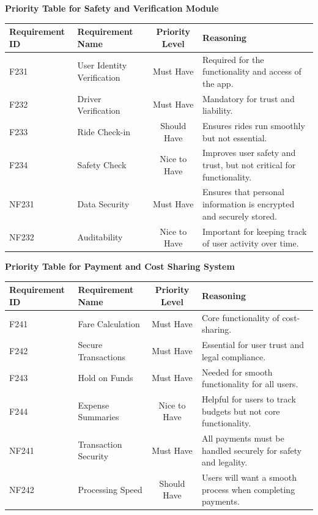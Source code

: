 \documentclass[12pt,letterpaper]{article}
\begin{document}
  \noindent \textbf{Priority Table for Safety and Verification Module}
  \vspace{0.5em}
  \begin{center}
  \small
  \begin{tabularx}{\textwidth}{|l|X|c|Y|}
  \hline
  \textbf{Requirement ID} & \textbf{Requirement Name} & \textbf{Priority Level} & \textbf{Reasoning} \\ \hline
  F231 & User Identity Verification & Must Have & Required for the functionality and access of the app. \\ \hline
  F232 & Driver Verification & Must Have & Mandatory for trust and liability. \\ \hline
  F233 & Ride Check-in & Should Have & Ensures rides run smoothly but not essential. \\ \hline
  F234 & Safety Check & Nice to Have & Improves user safety and trust, but not critical for functionality. \\ \hline
  NF231 & Data Security & Must Have & Ensures that personal information is encrypted and securely stored. \\ \hline
  NF232 & Auditability & Nice to Have & Important for keeping track of user activity over time. \\ \hline
  \end{tabularx}
\end{center}
  \vspace{2em}
  
  \noindent \textbf{Priority Table for Payment and Cost Sharing System}
  \vspace{0.5em}
  \begin{center}  
  \small
  \begin{tabularx}{\textwidth}{|l|X|c|Y|}
  \hline
  \textbf{Requirement ID} & \textbf{Requirement Name} & \textbf{Priority Level} & \textbf{Reasoning} \\ \hline
  F241 & Fare Calculation & Must Have & Core functionality of cost-sharing. \\ \hline
  F242 & Secure Transactions & Must Have & Essential for user trust and legal compliance. \\ \hline
  F243 & Hold on Funds & Must Have & Needed for smooth functionality for all users. \\ \hline
  F244 & Expense Summaries & Nice to Have & Helpful for users to track budgets but not core functionality. \\ \hline
  NF241 & Transaction Security & Must Have & All payments must be handled securely for safety and legality. \\ \hline
  NF242 & Processing Speed & Should Have & Users will want a smooth process when completing payments. \\ \hline
  \end{tabularx}
\end{center}
  \vspace{2em}
\end{document}
